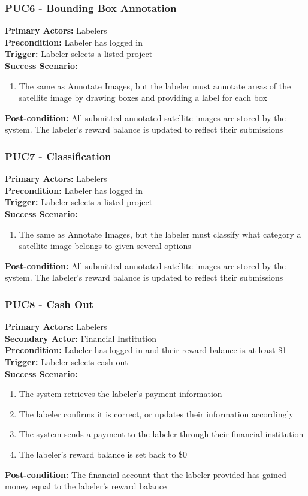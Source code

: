 \documentclass[12pt]{article}
\begin{document}
\subsubsection*{PUC6 - Bounding Box Annotation}
\label{sec:PUC6}
\textbf{Primary Actors:} Labelers\\ 
\textbf{Precondition:} Labeler has logged in\\
\textbf{Trigger:} Labeler selects a listed project\\
\textbf{Success Scenario:}
\begin{enumerate}
    \item The same as Annotate Images, but the labeler must annotate areas of the satellite image by drawing boxes and providing a label for each box
\end{enumerate}
\textbf{Post-condition:} All submitted annotated satellite images are stored by the system. The labeler's reward balance is updated to reflect their submissions

\subsubsection*{PUC7 - Classification}
\label{sec:PUC7}
\textbf{Primary Actors:} Labelers\\ 
\textbf{Precondition:} Labeler has logged in\\
\textbf{Trigger:} Labeler selects a listed project\\
\textbf{Success Scenario:}
\begin{enumerate}
    \item The same as Annotate Images, but the labeler must classify what category a satellite image belongs to given several options
\end{enumerate}
\textbf{Post-condition:} All submitted annotated satellite images are stored by the system. The labeler's reward balance is updated to reflect their submissions

\subsubsection*{PUC8 - Cash Out}
\label{sec:PUC8}
\textbf{Primary Actors:} Labelers\\
\textbf{Secondary Actor:} Financial Institution\\
\textbf{Precondition:} Labeler has logged in and their reward balance is at least \$1\\
\textbf{Trigger:} Labeler selects cash out\\
\textbf{Success Scenario:}
\begin{enumerate}
    \item The system retrieves the labeler's payment information
    \item The labeler confirms it is correct, or updates their information accordingly
    \item The system sends a payment to the labeler through their financial institution
    \item The labeler's reward balance is set back to \$0
\end{enumerate}
\textbf{Post-condition:} The financial account that the labeler provided has gained money equal to the labeler's reward balance
\end{document}
